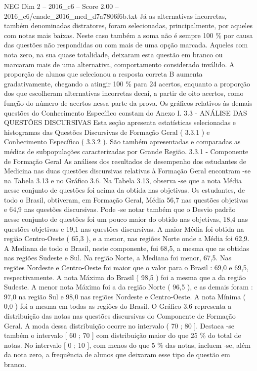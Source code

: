 \begin{textsample}{NEG Dim 2 – 2016\_c6 – Score 2.00 – 2016\_c6/enade\_2016\_med\_d7a7806f6b.txt}
Já as alternativas incorretas, também denominadas distratores, foram selecionadas, principalmente, por aqueles com notas mais baixas.
Neste caso também a soma não é sempre 100 \% por causa das questões não respondidas ou com mais de uma opção marcada.
Aqueles com nota zero, na sua quase totalidade, deixaram esta questão em branco ou marcaram mais de uma alternativa, comportamento considerado inválido.
A proporção de alunos que selecionou a resposta correta B aumenta gradativamente, chegando a atingir 100 \% para 24 acertos, enquanto a proporção dos que escolheram alternativas incorretas decai, a partir de oito acertos, como função do número de acertos nessa parte da prova.
Os gráficos relativos às demais questões do Conhecimento Específico constam do Anexo I. 3.3 - ANÁLISE DAS QUESTÕES DISCURSIVAS Esta seção apresenta estatísticas selecionadas e histogramas das Questões Discursivas de Formação Geral ( 3.3.1 ) e Conhecimento Específico ( 3.3.2 ).
São também apresentadas e comparadas as médias de subpopulações caracterizadas por Grande Região. 3.3.1 - Componente de Formação Geral As análises dos resultados de desempenho dos estudantes de Medicina nas duas questões discursivas relativas à Formação Geral encontram -se na Tabela 3.13 e no Gráfico 3.6.
Na Tabela 3.13, observa -se que a nota Média nesse conjunto de questões foi acima da obtida nas objetivas.
Os estudantes, de todo o Brasil, obtiveram, em Formação Geral, Média 56,7 nas questões objetivas e 64,9 nas questões discursivas.
Pode -se notar também que o Desvio padrão nesse conjunto de questões foi um pouco maior do obtido nas objetivas, 18,4 nas questões objetivas e 19,1 nas questões discursivas.
A maior Média foi obtida na região Centro-Oeste ( 65,3 ), e a menor, nas regiões Norte onde a Média foi 62,9.
A Mediana de todo o Brasil, neste componente, foi 68,5, a mesma que as obtidas nas regiões Sudeste e Sul.
Na região Norte, a Mediana foi menor, 67,5.
Nas regiões Nordeste e Centro-Oeste foi maior que o valor para o Brasil : 69,0 e 69,5, respectivamente.
A nota Máxima do Brasil ( 98,5 ) foi a mesma que a da região Sudeste.
A menor nota Máxima foi a da região Norte ( 96,5 ), e as demais foram : 97,0 na região Sul e 98,0 nas regiões Nordeste e Centro-Oeste.
A nota Mínima ( 0,0 ) foi a mesma em todas as regiões do Brasil.
O Gráfico 3.6 representa a distribuição das notas nas questões discursivas do Componente de Formação Geral.
A moda dessa distribuição ocorre no intervalo ( 70 ; 80 ].
Destaca -se também o intervalo [ 60 ; 70 ] com distribuição maior do que 25 \% do total de notas.
No intervalo [ 0 ; 10 ], com menos do que 5 \% das notas, incluem -se, além da nota zero, a frequência de alunos que deixaram esse tipo de questão em branco.

\end{textsample}
